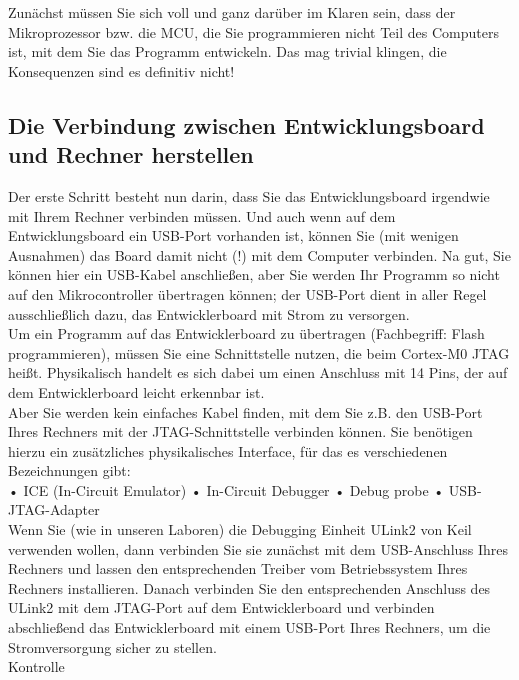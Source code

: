 Zunächst müssen Sie sich voll und ganz darüber im Klaren sein, dass der Mikroprozessor bzw. die MCU, die Sie programmieren nicht Teil des Computers ist, mit dem Sie das Programm entwickeln. Das mag trivial klingen, die Konsequenzen sind es definitiv nicht!

\subsection{Die Verbindung zwischen Entwicklungsboard und Rechner herstellen}

Der erste Schritt besteht nun darin, dass Sie das Entwicklungsboard irgendwie mit Ihrem Rechner verbinden müssen. Und auch wenn auf dem Entwicklungsboard ein USB-Port vorhanden ist, können Sie (mit wenigen Ausnahmen) das Board damit nicht (!) mit dem Computer verbinden. Na gut, Sie können hier ein USB-Kabel anschließen, aber Sie werden Ihr Programm so nicht auf den Mikrocontroller übertragen können; der USB-Port dient in aller Regel ausschließlich dazu, das Entwicklerboard mit Strom zu versorgen.\\

Um ein Programm auf das Entwicklerboard zu übertragen (Fachbegriff: Flash programmieren), müssen Sie eine Schnittstelle nutzen, die beim Cortex-M0 JTAG heißt. Physikalisch handelt es sich dabei um einen Anschluss mit 14 Pins, der auf dem Entwicklerboard leicht erkennbar ist.\\

Aber Sie werden kein einfaches Kabel finden, mit dem Sie z.B. den USB-Port Ihres Rechners mit der JTAG-Schnittstelle verbinden können. Sie benötigen hierzu ein zusätzliches physikalisches Interface, für das es verschiedenen Bezeichnungen gibt:\\

•	ICE (In-Circuit Emulator)
•	In-Circuit Debugger
•	Debug probe
•	USB-JTAG-Adapter\\

Wenn Sie (wie in unseren Laboren) die Debugging Einheit ULink2 von Keil verwenden wollen, dann verbinden Sie sie zunächst mit dem USB-Anschluss Ihres Rechners und lassen den entsprechenden Treiber vom Betriebssystem Ihres Rechners installieren. Danach verbinden Sie den  entsprechenden Anschluss des ULink2 mit dem JTAG-Port auf dem Entwicklerboard und verbinden abschließend das Entwicklerboard mit einem USB-Port Ihres Rechners, um die Stromversorgung sicher zu stellen.\\

Kontrolle\\

